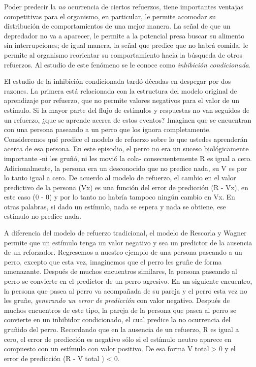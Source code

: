 \documentclass[
  letterpaper,
]{book}
\begin{document}
Poder predecir la \emph{no} ocurrencia de ciertos refuerzos, tiene
importantes ventajas competitivas para el organismo, en particular, le
permite acomodar su distribución de comportamientos de una mejor manera.
La señal de que un depredador no va a aparecer, le permite a la
potencial presa buscar su alimento sin interrupciones; de igual manera,
la señal que predice que no habrá comida, le permite al organismo
reorientar su comportamiento hacia la búsqueda de otros refuerzos. Al
estudio de este fenómeno se le conoce como \emph{inhibición
condicionada}.

El estudio de la inhibición condicionada tardó décadas en despegar por
dos razones. La primera está relacionada con la estructura del modelo
original de aprendizaje por refuerzo, que no permite valores negativos
para el valor de un estímulo. Si la mayor parte del ﬂujo de estímulos y
respuestas no van seguidos de un refuerzo, ¿que se aprende acerca de
estos eventos? Imaginen que se encuentran con una persona paseando a un
perro que los ignora completamente. Consideremos qué predice el modelo
de refuerzo sobre lo que ustedes aprenderán acerca de esa persona. En
este episodio, el perro no era un suceso biológicamente importante -ni
les gruñó, ni les movió la cola- consecuentemente R es igual a cero.
Adicionalmente, la persona era un desconocido que no predice nada, su V
es por lo tanto igual a cero. De acuerdo al modelo de refuerzo, el
cambio en el valor predictivo de la persona (Vx) es una función del
error de predicción (R - Vx), en este caso (0 - 0) y por lo tanto no
habría tampoco ningún cambio en Vx. En otras palabras, si dado un
estímulo, nada se espera y nada se obtiene, ese estímulo no predice
nada.

A diferencia del modelo de refuerzo tradicional, el modelo de Rescorla y
Wagner permite que un estímulo tenga un valor negativo y sea un
predictor de la ausencia de un reforzador. Regresemos a nuestro ejemplo
de una persona paseando a un perro, excepto que esta vez, imaginemos que
el perro les gruñe de forma amenazante. Después de muchos encuentros
similares, la persona paseando al perro se convierte en el predictor de
un perro agresivo. En un siguiente encuentro, la persona que pasea al
perro va acompañada de su pareja y el perro esta vez no les gruñe,
\emph{generando un error de predicción} con valor negativo. Después de
muchos encuentros de este tipo, la pareja de la persona que pasea al
perro se convierte en un inhibidor condicionado, el cual predice la no
ocurrencia del gruñido del perro. Recordando que en la ausencia de un
refuerzo, R es igual a cero, el error de predicción es negativo sólo si
el estímulo neutro aparece en compuesto con un estímulo con valor
positivo. De esa forma V total \textgreater{} 0 y el error de predicción
(R - V total ) \textless{} 0.
\end{document}
